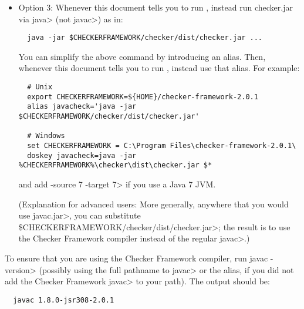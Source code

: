 \begin{itemize}
   \item
   Option 3:
   Whenever this document tells you to run , instead
   run checker.jar via \<java> (not \<javac>) as in:

\begin{Verbatim}
  java -jar $CHECKERFRAMEWORK/checker/dist/checker.jar ...
\end{Verbatim}

    You can simplify the above command by introducing an alias.  Then,
    whenever this document tells you to run , instead use that
    alias.  For example:

\begin{Verbatim}
  # Unix
  export CHECKERFRAMEWORK=${HOME}/checker-framework-2.0.1
  alias javacheck='java -jar $CHECKERFRAMEWORK/checker/dist/checker.jar'

  # Windows
  set CHECKERFRAMEWORK = C:\Program Files\checker-framework-2.0.1\
  doskey javacheck=java -jar %CHECKERFRAMEWORK%\checker\dist\checker.jar $*
\end{Verbatim}

   \noindent
   and add \<-source 7 -target 7> if you use a Java 7 JVM.

   (Explanation for advanced users:  More generally, anywhere that you would use \<javac.jar>, you can substitute
   \<\$CHECKERFRAMEWORK/checker/dist/checker.jar>;
   the result is to use the Checker
   Framework compiler instead of the regular \<javac>.)

\end{itemize}


To ensure that you are using the Checker Framework compiler, run
\<javac -version> (possibly using the
full pathname to \<javac> or the alias, if you did not add the Checker
Framework \<javac> to your path).
The output should be:

\begin{Verbatim}
  javac 1.8.0-jsr308-2.0.1
\end{Verbatim}




